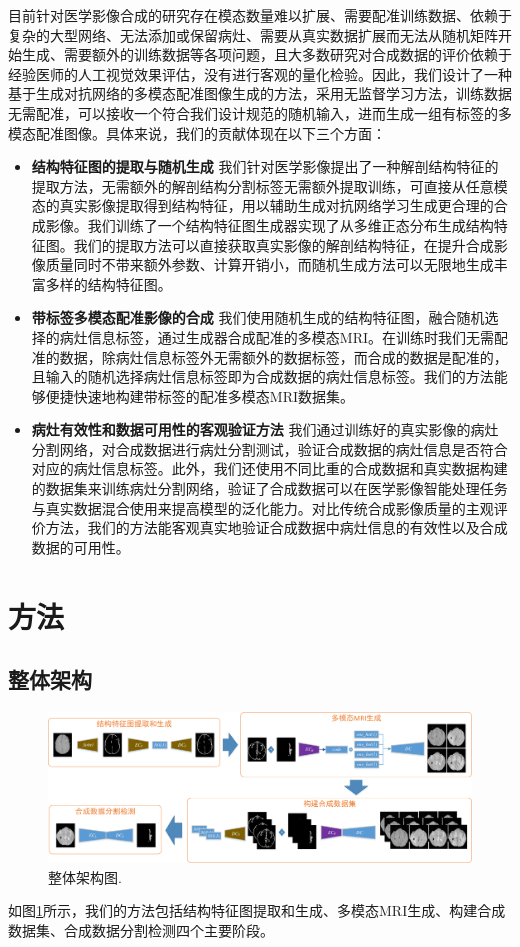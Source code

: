 \documentclass[letterpaper]{article} %
\begin{document}
目前针对医学影像合成的研究存在模态数量难以扩展、需要配准训练数据、依赖于复杂的大型网络、无法添加或保留病灶、需要从真实数据扩展而无法从随机矩阵开始生成、需要额外的训练数据等各项问题，且大多数研究对合成数据的评价依赖于经验医师的人工视觉效果评估，没有进行客观的量化检验。因此，我们设计了一种基于生成对抗网络的多模态配准图像生成的方法，采用无监督学习方法，训练数据无需配准，可以接收一个符合我们设计规范的随机输入，进而生成一组有标签的多模态配准图像。具体来说，我们的贡献体现在以下三个方面：
\begin{itemize}
\item \textbf{结构特征图的提取与随机生成}
我们针对医学影像提出了一种解剖结构特征的提取方法，无需额外的解剖结构分割标签无需额外提取训练，可直接从任意模态的真实影像提取得到结构特征，用以辅助生成对抗网络学习生成更合理的合成影像。我们训练了一个结构特征图生成器实现了从多维正态分布生成结构特征图。我们的提取方法可以直接获取真实影像的解剖结构特征，在提升合成影像质量同时不带来额外参数、计算开销小，而随机生成方法可以无限地生成丰富多样的结构特征图。
\item \textbf{带标签多模态配准影像的合成}
我们使用随机生成的结构特征图，融合随机选择的病灶信息标签，通过生成器合成配准的多模态MRI。在训练时我们无需配准的数据，除病灶信息标签外无需额外的数据标签，而合成的数据是配准的，且输入的随机选择病灶信息标签即为合成数据的病灶信息标签。我们的方法能够便捷快速地构建带标签的配准多模态MRI数据集。
\item \textbf{病灶有效性和数据可用性的客观验证方法}
我们通过训练好的真实影像的病灶分割网络，对合成数据进行病灶分割测试，验证合成数据的病灶信息是否符合对应的病灶信息标签。此外，我们还使用不同比重的合成数据和真实数据构建的数据集来训练病灶分割网络，验证了合成数据可以在医学影像智能处理任务与真实数据混合使用来提高模型的泛化能力。对比传统合成影像质量的主观评价方法，我们的方法能客观真实地验证合成数据中病灶信息的有效性以及合成数据的可用性。
\end{itemize}

\section{方法}
\subsection{整体架构}
\begin{figure}
	\centering
	\includegraphics[width=0.98\linewidth]{figures/architecture}
	\caption{整体架构图.}
	\label{architecture}
\end{figure}
如图\ref{architecture}所示，我们的方法包括结构特征图提取和生成、多模态MRI生成、构建合成数据集、合成数据分割检测四个主要阶段。
\end{document}
